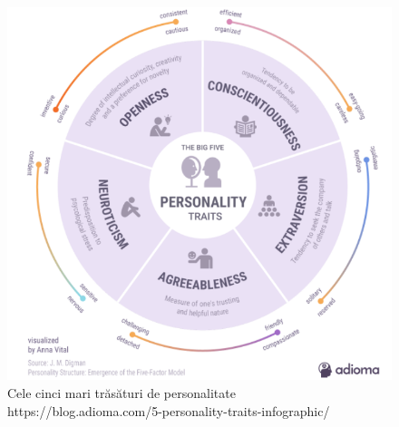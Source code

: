 \documentclass[a4paper, 12pt]{report}
\begin{document}
	\begin{figure}[h]
		\begin{center}
			\includegraphics[scale=0.7]{images/ocean.png}
		\end{center}
		\caption{Cele cinci mari trăsături de personalitate\newline
			\hspace{\linewidth}https://blog.adioma.com/5-personality-traits-infographic/}
		\label{fig:ocean}
	\end{figure}
	
\end{document}

